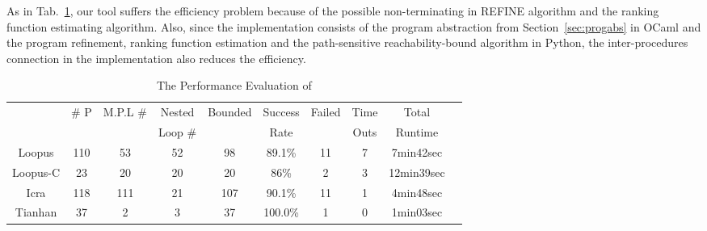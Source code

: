 As in Tab.~\ref{tb:performance-eval}, our tool suffers the efficiency problem because of the possible non-terminating in REFINE algorithm and the ranking function estimating algorithm.
Also, since the implementation consists of the 
program abstraction from Section~\ref{sec:progabs} in OCaml and the program refinement, ranking function estimation and the path-sensitive reachability-bound algorithm in Python, the inter-procedures connection in the implementation also reduces the efficiency.


\begin{table}[H]
    \caption{The Performance Evaluation of {\THESYSTEM}}
    \label{tb:performance-eval}
    \centering
        {\footnotesize
        \begin{tabular}{ >{\small}c | c | c | c | c | c | c | c | c | c }
            \multirow{2}{*}{Benchmark} & \multirow{2}{*}{\# P}  & \multirow{2}{*}{M.P.L \#} & Nested  & \multirow{2}{*}{Bounded} & {Success} & \multirow{2}{*}{Failed} & Time  & Total\\
             &  &  & Loop \# & & Rate &  & Outs &   Runtime \\
            \hline
                {Loopus} & {110}  & 53  & 52  & 98 & 89.1\% & 11 & 7 & 7min42sec \\
                \hline
                Loopus-C & 23  & 20 & 20 & {20} & {86\%}  & 2 & 3 & {12min39sec} \\
                \hline
                {Icra} & 118 & 111 & 21 & 107 & 90.1\% & 11 & 1 & {4min48sec} \\
                \hline
                Tianhan & 37 & 2 & 3 & 37 & 100.0\% & 1 & 0 & 1min03sec \\
                \hline
            \end{tabular}    
        }
    \end{table}
